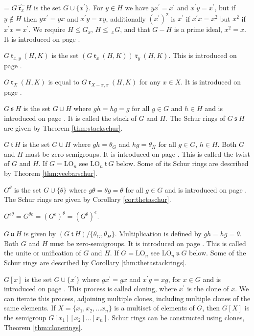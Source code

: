 \documentclass{article}
\makeatletter
\newcommand{\hangpara}[2]{\hangindent#1\hangafter#2\noindent}
\newenvironment{hangparas}[2]{\setlength{\parindent}{\z@}
  \everypar={\hangpara{#1}{#2}}}{\par}
\theoremstyle{plain}
\theoremstyle{definition}
\newcommand{\thmref}[1]{Theorem \ref{#1}}
\newcommand{\corref}[1]{Corollary \ref{#1}}
\newcommand{\LO}{\mathrm{LO}}
\newcommand{\s}{\ \mathfrak{s}\ }
\renewcommand{\t}{\ \mathfrak{t}\ }
\renewcommand{\u}{\ \mathfrak{u}\ }
\renewcommand{\r}[1]{\ \mathfrak{r}_{#1}\ }
\newcommand{\rhat}[1]{\ \widehat{\mathfrak{r}_{#1}}\ }
\makeatother
\begin{document}
\begin{hangparas}{15pt}{1}
$G \rhat x H$ is the set $G\cup\{x^\prime\}$. For $y\in H$ we have $yx^\prime=x^\prime$ and $x^\prime y = x^\prime$, but if $y\not\in H$ then $yx^\prime=yx$ and $x^\prime y = xy$, additionally $(x^\prime)^2$ is $x^\prime$ if $x^\prime x=x^2$ but $x^2$ if $x^\prime x = x^\prime$. We require $H\leq G_x$, $H\leq\ _x G$, and that $G-H$ is a prime ideal, $x^2=x$. It is introduced on page \pageref{rosterhat}.

$G\r{x,y} (H,K)$ is the set $(G\r x (H,K))\r y(H,K)$. This is introduced on page \pageref{rosterdual}.

$G\r X (H,K)$ is equal to $G\r{X-x,x} (H,K)$ for any $x\in X$. It is introduced on page \pageref{rinduction}.

$G \s H$ is the set $G\cup H$ where $gh=hg=g$ for all $g\in G$ and $h\in H$ and is introduced on page \pageref{stack}. It is called the stack of $G$ and $H$. The Schur rings of $G \s H$ are given by \thmref{thm:stackschur}.

$G \t H$ is the set $G\cup H$ where $gh=\theta_G$ and $hg=\theta_H$ for all $g\in G$, $h\in H$. Both $G$ and $H$ must be zero-semigroups. It is introduced on page \pageref{twist}. This is called the twist of $G$ and $H$. If $G=\LO_n$ see $\LO_n \t G$ below. Some of its Schur rings are described by \thmref{thm:veebarschur}.

$G^\theta$ is the set $G\cup\{\theta\}$ where $g\theta=\theta g = \theta$ for all $g\in G$ and is introduced on page \pageref{theta}. The Schur rings are given by \corref{cor:thetaschur}.

$G^{e\theta}=G^{\theta e} = (G^e)^\theta = (G^\theta)^e$.

$G \u H$ is given by $(G\t H)/\{\theta_G, \theta_H\}$. Multiplication is defined by $gh=hg=\theta$. Both $G$ and $H$ must be zero-semigroups. It is introduced on page \pageref{unite}. This is called the unite or unification of $G$ and $H$. If $G=\LO_n$ see $\LO_n \u G$ below. Some of the Schur rings are described by \corref{thm:thetastackrings}.

$G[x]$ is the set $G\cup \{x^\prime\}$ where $gx^\prime = gx$ and $x^\prime g = xg$, for $x\in G$ and is introduced on page \pageref{clone}. This process is called cloning, where $x^\prime$ is the clone of $x$. We can iterate this process, adjoining multiple clones, including multiple clones of the same elements. If $X=\{x_1, x_2, \ldots x_n\}$ is a multiset of elements of $G$, then $G[X]$ is the semigroup $G[x_1][x_2]\ldots[x_n]$. Schur rings can be constructed using clones, \thmref{thm:clonerings}.


\end{hangparas}
\end{document}
